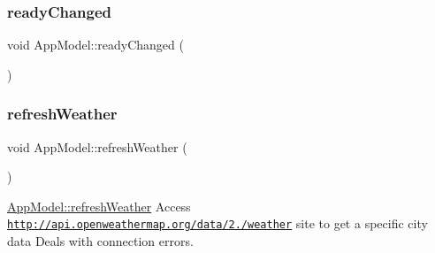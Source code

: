\subsubsection{\texorpdfstring{ready\+Changed}{readyChanged}}
{\footnotesize\ttfamily void App\+Model\+::ready\+Changed (\begin{DoxyParamCaption}{ }\end{DoxyParamCaption})\hspace{0.3cm}{\ttfamily [signal]}}

\mbox{\label{class_app_model_a37e1da9d028779f7f0fc908e4c04fa76}} 
\subsubsection{\texorpdfstring{refresh\+Weather}{refreshWeather}}
{\footnotesize\ttfamily void App\+Model\+::refresh\+Weather (\begin{DoxyParamCaption}{ }\end{DoxyParamCaption})\hspace{0.3cm}{\ttfamily [slot]}}



\hyperlink{class_app_model_a37e1da9d028779f7f0fc908e4c04fa76}{App\+Model\+::refresh\+Weather} Access \href{http://api.openweathermap.org/data/2.5/weather}{\tt http\+://api.\+openweathermap.\+org/data/2./weather} site to get a specific city data Deals with connection errors. 

